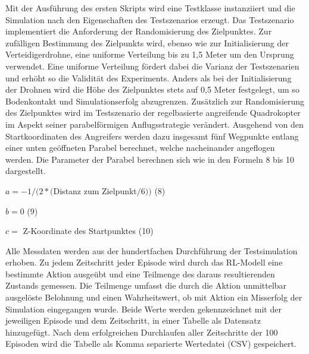 Mit der Ausführung des ersten Skripts wird eine Testklasse instanziiert und die Simulation nach den Eigenschaften des Testszenarios erzeugt.
Das Testszenario implementiert die Anforderung der Randomisierung des Zielpunktes.
Zur zufälligen Bestimmung des Zielpunkts wird, ebenso wie zur Initialisierung der Verteidigerdrohne, eine uniforme Verteilung bis zu 1,5 Meter um den Ursprung verwendet.
Eine uniforme Verteilung fördert dabei die Varianz der Testszenarien und erhöht so die Validität des Experiments.
Anders als bei der Initialisierung der Drohnen wird die Höhe des Zielpunktes stets auf 0,5 Meter festgelegt, um so Bodenkontakt und Simulationserfolg abzugrenzen.
Zusätzlich zur Randomisierung des Zielpunktes wird im Testszenario der regelbasierte angreifende Quadrokopter im Aspekt seiner parabelförmigen Anflugsstrategie verändert.
Ausgehend von den Startkoordinaten des Angreifers werden dazu insgesamt fünf Wegpunkte entlang einer unten geöffneten Parabel berechnet, welche nacheinander angeflogen werden.
Die Parameter der Parabel berechnen sich wie in den Formeln 8 bis 10 dargestellt.

\begin{description}
    \item \begin{center} $ a = -1 / (2 * ($Distanz zum Zielpunkt$ / 6))$ (8)\end{center}
    \item \begin{center} $ b = 0$ (9)\end{center}
    \item \begin{center} $ c = $ Z-Koordinate des Startpunktes (10)\end{center}
\end{description}

Alle Messdaten werden aus der hundertfachen Durchführung der Testsimulation erhoben.
Zu jedem Zeitschritt jeder Episode wird durch das RL-Modell eine bestimmte Aktion ausgeübt und eine Teilmenge des daraus resultierenden Zustands gemessen.
Die Teilmenge umfasst die durch die Aktion unmittelbar ausgelöste Belohnung und einen Wahrheitswert, ob mit Aktion ein Misserfolg der Simulation eingegangen wurde.
Beide Werte werden gekennzeichnet mit der jeweiligen Episode und dem Zeitschritt, in einer Tabelle als Datensatz hinzugefügt.
Nach dem erfolgreichen Durchlaufen aller Zeitschritte der 100 Episoden wird die Tabelle als Komma separierte Wertedatei (CSV) gespeichert.

